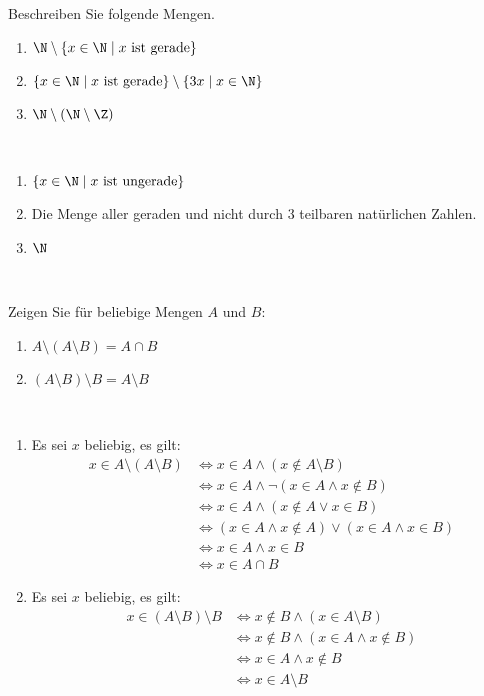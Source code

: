 \begin{example}
Beschreiben Sie folgende Mengen.
\begin{enumerate}
\item $\N\setminus\{x\in\N\mid x \text{ ist gerade} \}$
\item $\{x\in\N\mid x\text{ ist gerade} \}\setminus \{3x\mid x\in \N \}$
\item $\N\setminus (\N\setminus \Z)$
\end{enumerate}
\end{example}
\begin{example}
{~
\begin{enumerate}
\item $\{x\in \N\mid x\text{ ist ungerade} \}$
\item Die Menge aller geraden und nicht durch $3$ teilbaren natürlichen Zahlen.
\item $\N$
\end{enumerate}
}
{~
\answerspace{4cm}}
\end{example}

\begin{example}
Zeigen Sie für beliebige Mengen $A$ und $B$:
\begin{enumerate}
\item $A\setminus(A\setminus B)=A\cap B$
\item $(A\setminus B)\setminus B=A\setminus B$
\end{enumerate}
\end{example}
\begin{example}
{~
	\begin{enumerate}
	\item Es sei $x$ beliebig, es gilt:
	\begin{align*}
	x\in A\setminus (A\setminus B)&\Leftrightarrow x\in A\land (x\notin A\setminus B)\\
	&\Leftrightarrow x\in A\land \neg(x\in A\land x\notin B)\\
	&\Leftrightarrow x\in A\land (x\notin A\lor x\in B)\\
	&\Leftrightarrow (x\in A\land x\notin A)\lor (x\in A\land x\in B)\\
	&\Leftrightarrow x\in A\land x\in B\\
	&\Leftrightarrow x\in A\cap B
	\end{align*}
	\item Es sei $x$ beliebig, es gilt:
	\begin{align*}
	x\in (A\setminus B)\setminus B&\Leftrightarrow x\notin B\land (x\in A\setminus B)\\
	&\Leftrightarrow x\notin B\land (x\in A\land x\notin B)\\
	&\Leftrightarrow x\in A\land x\notin B\\
	&\Leftrightarrow x\in A\setminus B
	\end{align*}
	\end{enumerate}
}
{~
	\answerspace{8cm}
}
\end{example}

